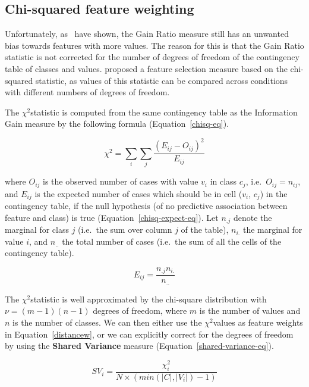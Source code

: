 \documentclass{report}
\newcommand{\chisq}{{$ \chi^2 $}}
\begin{document}
\subsection{Chi-squared feature weighting}
\label{chisquared}

Unfortunately, as~ have shown, the Gain Ratio measure
still has an unwanted bias towards features with more values. The
reason for this is that the Gain Ratio statistic is not corrected for
the number of degrees of freedom of the contingency table of classes
and values.  proposed a feature selection measure based
on the chi-squared statistic, as values of this statistic can be
compared across conditions with different numbers of degrees of
freedom.

The \chisq statistic is computed from the same contingency table as
the Information Gain measure by the following formula
(Equation~\ref{chisq-eq}).

\begin{equation} 
\chi^{2} = \sum_{i} \sum_{j} \frac{(E_{ij} - O_{ij})^{2}}
				  {E_{ij}} 
\label{chisq-eq}
\end{equation} 

where $O_{ij}$ is the observed number of cases with value $v_{i}$ in
class $c_{j}$, i.e.~$O_{ij} = n_{ij}$, and $E_{ij}$ is the expected
number of cases which should be in cell ($v_{i}$, $c_{j}$) in the
contingency table, if the null hypothesis (of no predictive
association between feature and class) is true
(Equation~\ref{chisq-expect-eq}). Let $n_{.j}$ denote the marginal for
class $j$ (i.e.~the sum over column $j$ of the table), $n_{i.}$ the
marginal for value $i$, and $n_{..}$ the total number of cases
(i.e.~the sum of all the cells of the contingency table).

\begin{equation}
E_{ij} = \frac{n_{.j} n_{i.}}{n_{..}}
\label{chisq-expect-eq}
\end{equation}

The \chisq statistic is well approximated by the chi-square
distribution with $\nu = (m-1)(n-1)$ degrees of freedom, where $m$ is
the number of values and $n$ is the number of classes. We can then
either use the \chisq values as feature weights in
Equation~\ref{distancew}, or we can explicitly correct for the degrees
of freedom by using the {\bf Shared Variance} measure
(Equation~\ref{shared-variance-eq}).

\begin{equation}
SV_{i} = \frac{ \chi^2_{i}}{N \times ( min(|C|,|V_{i}|)-1 ) }
\label{shared-variance-eq}
\end{equation}
\end{document}
